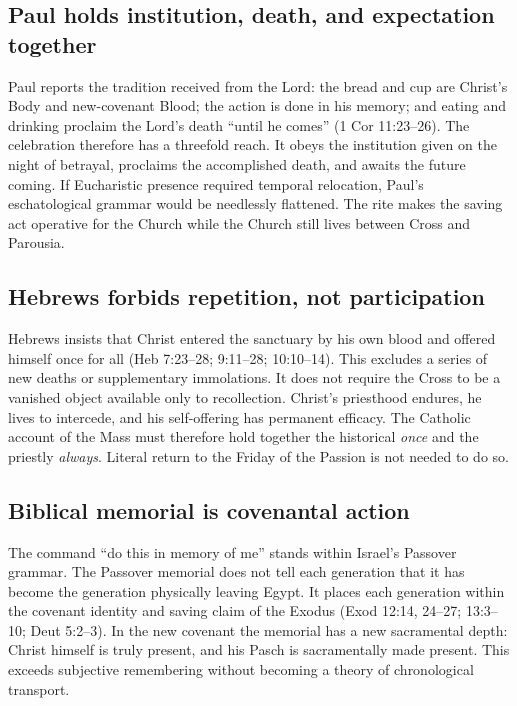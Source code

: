 \begin{deepstudy}
\subsection*{Paul holds institution, death, and expectation together}

Paul reports the tradition received from the Lord: the bread and cup are
Christ's Body and new-covenant Blood; the action is done in his memory; and
eating and drinking proclaim the Lord's death ``until he comes'' (1 Cor
11:23--26). The celebration therefore has a threefold reach. It obeys the
institution given on the night of betrayal, proclaims the accomplished death,
and awaits the future coming. If Eucharistic presence required temporal
relocation, Paul's eschatological grammar would be needlessly flattened. The
rite makes the saving act operative for the Church while the Church still
lives between Cross and Parousia.

\subsection*{Hebrews forbids repetition, not participation}

Hebrews insists that Christ entered the sanctuary by his own blood and offered
himself once for all (Heb 7:23--28; 9:11--28; 10:10--14). This excludes a
series of new deaths or supplementary immolations. It does not require the
Cross to be a vanished object available only to recollection. Christ's
priesthood endures, he lives to intercede, and his self-offering has permanent
efficacy. The Catholic account of the Mass must therefore hold together the
historical \emph{once} and the priestly \emph{always}. Literal return to the
Friday of the Passion is not needed to do so.

\subsection*{Biblical memorial is covenantal action}

The command ``do this in memory of me'' stands within Israel's Passover
grammar. The Passover memorial does not tell each generation that it has become
the generation physically leaving Egypt. It places each generation within the
covenant identity and saving claim of the Exodus (Exod 12:14, 24--27; 13:3--10;
Deut 5:2--3). In the new covenant the memorial has a new sacramental depth:
Christ himself is truly present, and his Pasch is sacramentally made present.
This exceeds subjective remembering without becoming a theory of chronological
transport.


\end{deepstudy}
